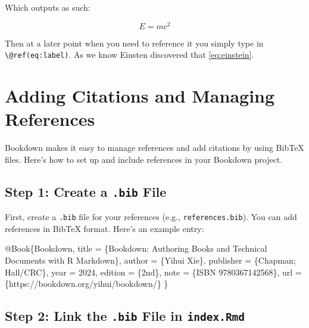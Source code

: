 \documentclass[
]{book}
\newenvironment{Shaded}{\begin{snugshade}}{\end{snugshade}}
\newcommand{\DataTypeTok}[1]{\textcolor[rgb]{0.13,0.29,0.53}{#1}}
\newcommand{\NormalTok}[1]{#1}
\newcommand{\OtherTok}[1]{\textcolor[rgb]{0.56,0.35,0.01}{#1}}
\newcommand{\VariableTok}[1]{\textcolor[rgb]{0.00,0.00,0.00}{#1}}
\theoremstyle{definition}
\theoremstyle{definition}
\theoremstyle{definition}
\theoremstyle{definition}
\theoremstyle{remark}
\begin{document}
Which outputs as such:

\begin{equation}
  E = mc^2
  \label{eq:einstein}
\end{equation}

Then at a later point when you need to reference it you simply type in \texttt{\textbackslash{}@ref(eq:label)}. As we know Einsten discovered that \eqref{eq:einstein}.

\section{Adding Citations and Managing References}\label{adding-citations-and-managing-references}

Bookdown makes it easy to manage references and add citations by using BibTeX files. Here's how to set up and include references in your Bookdown project.

\subsection{\texorpdfstring{Step 1: Create a \texttt{.bib} File}{Step 1: Create a .bib File}}\label{step-1-create-a-.bib-file}

First, create a \texttt{.bib} file for your references (e.g., \texttt{references.bib}). You can add references in BibTeX format. Here's an example entry:

\begin{Shaded}
\begin{Highlighting}[]
\VariableTok{@Book}\NormalTok{\{}\OtherTok{Bookdown}\NormalTok{,}
  \DataTypeTok{title}\NormalTok{     = \{Bookdown: Authoring Books and Technical Documents with R Markdown\},}
  \DataTypeTok{author}\NormalTok{    = \{Yihui Xie\},}
  \DataTypeTok{publisher}\NormalTok{ = \{Chapman; Hall/CRC\},}
  \DataTypeTok{year}\NormalTok{      = 2024,}
  \DataTypeTok{edition}\NormalTok{   = \{2nd\},}
  \DataTypeTok{note}\NormalTok{      = \{ISBN 9780367142568\},}
  \DataTypeTok{url}\NormalTok{       = \{https://bookdown.org/yihui/bookdown/\}}
\NormalTok{\}}
\end{Highlighting}
\end{Shaded}

\subsection{\texorpdfstring{Step 2: Link the \texttt{.bib} File in \texttt{index.Rmd}}{Step 2: Link the .bib File in index.Rmd}}\label{step-2-link-the-.bib-file-in-index.rmd}
\end{document}
